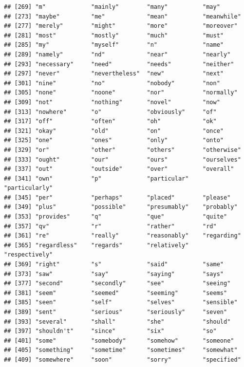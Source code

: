 \documentclass[]{book}
\begin{document}
\begin{verbatim}
## [269] "m"             "mainly"        "many"          "may"          
## [273] "maybe"         "me"            "mean"          "meanwhile"    
## [277] "merely"        "might"         "more"          "moreover"     
## [281] "most"          "mostly"        "much"          "must"         
## [285] "my"            "myself"        "n"             "name"         
## [289] "namely"        "nd"            "near"          "nearly"       
## [293] "necessary"     "need"          "needs"         "neither"      
## [297] "never"         "nevertheless"  "new"           "next"         
## [301] "nine"          "no"            "nobody"        "non"          
## [305] "none"          "noone"         "nor"           "normally"     
## [309] "not"           "nothing"       "novel"         "now"          
## [313] "nowhere"       "o"             "obviously"     "of"           
## [317] "off"           "often"         "oh"            "ok"           
## [321] "okay"          "old"           "on"            "once"         
## [325] "one"           "ones"          "only"          "onto"         
## [329] "or"            "other"         "others"        "otherwise"    
## [333] "ought"         "our"           "ours"          "ourselves"    
## [337] "out"           "outside"       "over"          "overall"      
## [341] "own"           "p"             "particular"    "particularly" 
## [345] "per"           "perhaps"       "placed"        "please"       
## [349] "plus"          "possible"      "presumably"    "probably"     
## [353] "provides"      "q"             "que"           "quite"        
## [357] "qv"            "r"             "rather"        "rd"           
## [361] "re"            "really"        "reasonably"    "regarding"    
## [365] "regardless"    "regards"       "relatively"    "respectively" 
## [369] "right"         "s"             "said"          "same"         
## [373] "saw"           "say"           "saying"        "says"         
## [377] "second"        "secondly"      "see"           "seeing"       
## [381] "seem"          "seemed"        "seeming"       "seems"        
## [385] "seen"          "self"          "selves"        "sensible"     
## [389] "sent"          "serious"       "seriously"     "seven"        
## [393] "several"       "shall"         "she"           "should"       
## [397] "shouldn't"     "since"         "six"           "so"           
## [401] "some"          "somebody"      "somehow"       "someone"      
## [405] "something"     "sometime"      "sometimes"     "somewhat"     
## [409] "somewhere"     "soon"          "sorry"         "specified"    

\end{verbatim}
\end{document}
